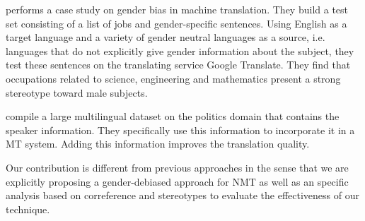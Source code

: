 \documentclass[11pt,a4paper]{article}
\begin{document}


\citet{prates:2018} performs a case study on gender bias in machine translation. 
They build a test set consisting of a list of jobs and gender-specific sentences. 
Using English as a target language and a variety of gender neutral languages as a source, i.e. languages that do not explicitly give gender information about the subject, they test these sentences on the translating service Google Translate.
They find that occupations related to science, engineering and mathematics present a strong stereotype toward male subjects.

\citet{eva:2018} compile a large multilingual dataset on the politics domain that contains the speaker information. They specifically use this information to incorporate it in a MT system. Adding this information improves the translation quality.

Our contribution is different from previous approaches in the sense that we are explicitly proposing a gender-debiased approach for NMT as well as an specific analysis based on correference and stereotypes to evaluate the effectiveness of our technique.
\end{document}
